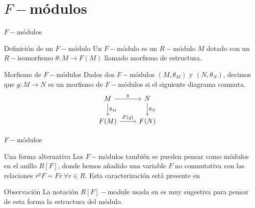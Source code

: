 \documentclass{beamer}
\begin{document}

\section{$F-$módulos}

\begin{frame}[fragile]{$F-$módulos}
\begin{block}{Definición de un $F-$módulo}
  Un $F-$módulo es un  $R-$módulo  $M$ dotado con un  $R-$isomorfismo  $\theta :M \to F(M)$ llamado morfismo de estructura.
\end{block}
\begin{block}{Morfismo de $F-$módulos}
  Dados dos $F-$módulos  $(M, \theta _M)$ y $(N, \theta _N)$, decimos que $g:M \to N$ es un morfismo de $F-$módulos si el siguiente diagrama conmuta.
\[\begin{tikzcd}
	M & N \\
	{F(M)} & {F(N)}
	\arrow["{\theta_M}", from=1-1, to=2-1]
	\arrow["{\theta_N}", from=1-2, to=2-2]
	\arrow["g", from=1-1, to=1-2]
	\arrow["{F(g)}", from=2-1, to=2-2]
\end{tikzcd}\]
\end{block}
\end{frame}


\begin{frame}[fragile]{$F-$módulos}
\begin{block}{Una forma alternativa}
  Los $F-$módulos también se pueden pensar como módulos en el anillo $R[F]$, donde hemos añadido una variable  $F$ no conmutativa con las relaciones $r^pF = Fr \ \forall r\in R$. Esta caracterización está presente en \cite{blickle}
\end{block}
\begin{block}{Observación}
  La notación $R[F]-$module usada en  \cite{blickle} es muy sugestiva para pensar de esta forma la estructura del módulo.
\end{block}
\end{frame}
\end{document}
